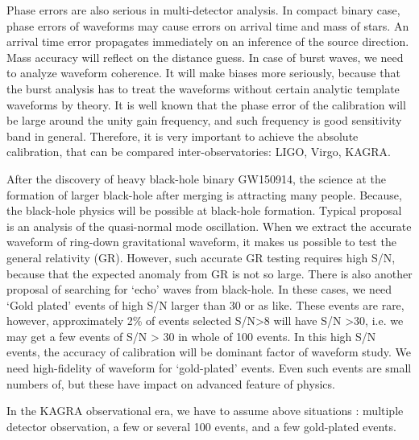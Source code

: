 Phase errors are also serious in multi-detector analysis. 
In compact binary case, phase errors of waveforms may cause errors on arrival time and mass of stars.
An arrival time error propagates immediately on an inference of the source direction.
Mass accuracy will reflect on the distance guess.
In case of burst waves, we need to analyze waveform coherence. It will make biases more seriously, because that the burst analysis has to treat the waveforms without 
certain analytic template waveforms by theory. It is well known that the phase error of the 
calibration will be large around the unity gain frequency, and such frequency is good sensitivity 
band in general. Therefore, it is very important to achieve the absolute calibration, that can be 
compared inter-observatories: LIGO, Virgo, KAGRA.

After the discovery of heavy black-hole binary GW150914, the science at the formation of larger 
black-hole after merging is attracting many people. Because, the black-hole physics will be possible 
at black-hole formation. Typical proposal is an analysis of the quasi-normal mode oscillation. When 
we extract the accurate waveform of ring-down gravitational waveform, it makes us possible to test 
the general relativity (GR). However, such accurate GR testing requires high S/N, because that the 
expected anomaly from GR is not so large. There is also another proposal of searching for `echo' 
waves from black-hole. In these cases, we need `Gold plated' events of high S/N larger than 30 or as 
like. These events are rare, however, approximately 2\% of events selected S/N>8 will have S/N >30, 
i.e. we may get a few events of S/N > 30 in whole of 100 events. 
In this high S/N events, the accuracy of calibration will be dominant factor of waveform study. 
We need high-fidelity of waveform for `gold-plated' events. 
Even such events are small numbers of, but these have impact on advanced feature of physics.

In the KAGRA observational era, we have to assume above situations : multiple detector observation, 
a few or several 100 events, and a few gold-plated events.



